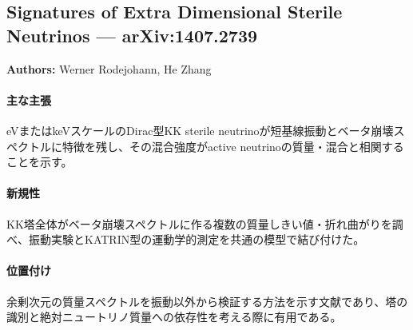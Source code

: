 \subsection{Signatures of Extra Dimensional Sterile Neutrinos --- arXiv:1407.2739}

\textbf{Authors:} Werner Rodejohann, He Zhang

\paragraph{主な主張}
eVまたはkeVスケールのDirac型KK sterile neutrinoが短基線振動とベータ崩壊スペクトルに特徴を残し、その混合強度がactive neutrinoの質量・混合と相関することを示す\cite{Rodejohann:2014KKSignatures}。

\paragraph{新規性}
KK塔全体がベータ崩壊スペクトルに作る複数の質量しきい値・折れ曲がりを調べ、振動実験とKATRIN型の運動学的測定を共通の模型で結び付けた。

\paragraph{位置付け}
余剰次元の質量スペクトルを振動以外から検証する方法を示す文献であり、塔の識別と絶対ニュートリノ質量への依存性を考える際に有用である。

